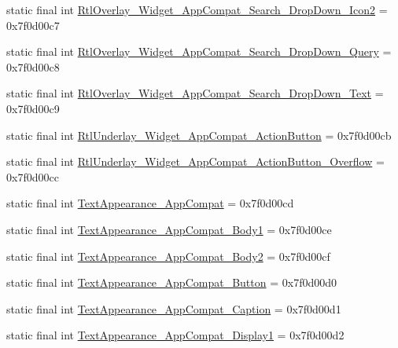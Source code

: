 \begin{DoxyCompactItemize}
\item 
static final int \mbox{\hyperlink{classandroid_1_1support_1_1v7_1_1appcompat_1_1R_1_1style_ac0d2345330dd831f232f53ea121e66be}{Rtl\+Overlay\+\_\+\+Widget\+\_\+\+App\+Compat\+\_\+\+Search\+\_\+\+Drop\+Down\+\_\+\+Icon2}} = 0x7f0d00c7
\item 
static final int \mbox{\hyperlink{classandroid_1_1support_1_1v7_1_1appcompat_1_1R_1_1style_abaa10d6dd2e8d619861a432668532862}{Rtl\+Overlay\+\_\+\+Widget\+\_\+\+App\+Compat\+\_\+\+Search\+\_\+\+Drop\+Down\+\_\+\+Query}} = 0x7f0d00c8
\item 
static final int \mbox{\hyperlink{classandroid_1_1support_1_1v7_1_1appcompat_1_1R_1_1style_a57c7183cd74f896000a7edc8600208d0}{Rtl\+Overlay\+\_\+\+Widget\+\_\+\+App\+Compat\+\_\+\+Search\+\_\+\+Drop\+Down\+\_\+\+Text}} = 0x7f0d00c9
\item 
static final int \mbox{\hyperlink{classandroid_1_1support_1_1v7_1_1appcompat_1_1R_1_1style_ace2f5725c7ad367707fd108f93a35fa0}{Rtl\+Underlay\+\_\+\+Widget\+\_\+\+App\+Compat\+\_\+\+Action\+Button}} = 0x7f0d00cb
\item 
static final int \mbox{\hyperlink{classandroid_1_1support_1_1v7_1_1appcompat_1_1R_1_1style_a32b360b3a3dbd458e27c881a1b51856e}{Rtl\+Underlay\+\_\+\+Widget\+\_\+\+App\+Compat\+\_\+\+Action\+Button\+\_\+\+Overflow}} = 0x7f0d00cc
\item 
static final int \mbox{\hyperlink{classandroid_1_1support_1_1v7_1_1appcompat_1_1R_1_1style_a42b9227b2e55ee8feb8221dd6d1f3ec4}{Text\+Appearance\+\_\+\+App\+Compat}} = 0x7f0d00cd
\item 
static final int \mbox{\hyperlink{classandroid_1_1support_1_1v7_1_1appcompat_1_1R_1_1style_a00c54a311c223f13abcddcd7ecffc64c}{Text\+Appearance\+\_\+\+App\+Compat\+\_\+\+Body1}} = 0x7f0d00ce
\item 
static final int \mbox{\hyperlink{classandroid_1_1support_1_1v7_1_1appcompat_1_1R_1_1style_af4f8889eec33c1bb9086e718a767fdb2}{Text\+Appearance\+\_\+\+App\+Compat\+\_\+\+Body2}} = 0x7f0d00cf
\item 
static final int \mbox{\hyperlink{classandroid_1_1support_1_1v7_1_1appcompat_1_1R_1_1style_aa801b76dbf3b1122307d7c57c10abcc1}{Text\+Appearance\+\_\+\+App\+Compat\+\_\+\+Button}} = 0x7f0d00d0
\item 
static final int \mbox{\hyperlink{classandroid_1_1support_1_1v7_1_1appcompat_1_1R_1_1style_aa31b7e463497b5c15b8f6cdf69aa09b5}{Text\+Appearance\+\_\+\+App\+Compat\+\_\+\+Caption}} = 0x7f0d00d1
\item 
static final int \mbox{\hyperlink{classandroid_1_1support_1_1v7_1_1appcompat_1_1R_1_1style_a0623e3bb13bb0517311ed9a7f9fd906e}{Text\+Appearance\+\_\+\+App\+Compat\+\_\+\+Display1}} = 0x7f0d00d2

\end{DoxyCompactItemize}
